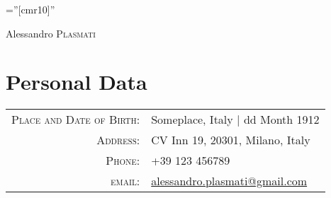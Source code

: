 \documentclass[a4paper,10pt]{article}
\begin{document}

\pagestyle{empty} %

\font\fb=''[cmr10]'' %

\par{\centering
	{\Huge Alessandro \textsc{Plasmati}
	}\bigskip\par}

\section{Personal Data}

\begin{tabular}{rl}
	\textsc{Place and Date of Birth:} & Someplace, Italy  | dd Month 1912                                          \\
	\textsc{Address:}                 & CV Inn 19, 20301, Milano, Italy                                            \\
	\textsc{Phone:}                   & +39 123 456789                                                             \\
	\textsc{email:}                   & \href{mailto:alessandro.plasmati@gmail.com}{alessandro.plasmati@gmail.com}
\end{tabular}

\end{document}
